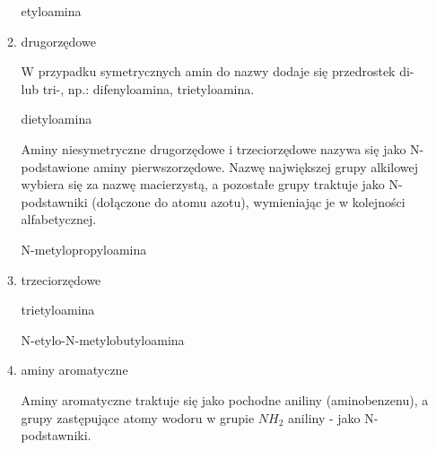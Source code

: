 \begin{itemize}
\begin{enumerate}
\begin{center}
            etyloamina
        \end{center}

        \item drugorzędowe
        

        W przypadku symetrycznych amin do nazwy dodaje się przedrostek di- lub tri-, np.: difenyloamina, trietyloamina.

        \begin{center}
        
       
            dietyloamina
        \end{center}

        Aminy niesymetryczne drugorzędowe i trzeciorzędowe nazywa się jako N-podstawione aminy pierwszorzędowe. Nazwę największej grupy alkilowej wybiera się za nazwę macierzystą, a pozostałe grupy traktuje jako N-podstawniki (dołączone do atomu azotu), wymieniając je w kolejności alfabetycznej.

        \begin{center}
        
       
            N-metylopropyloamina
        \end{center}
        \item trzeciorzędowe
        

        \begin{center}
        
       
            trietyloamina
        \end{center}

        \begin{center}
        
       
            N-etylo-N-metylobutyloamina
        \end{center}
        \item aminy aromatyczne
        \newline

        Aminy aromatyczne traktuje się jako pochodne aniliny (aminobenzenu), a grupy zastępujące atomy wodoru w grupie $NH_2$ aniliny - jako N-podstawniki.


\end{enumerate}
\end{itemize}
